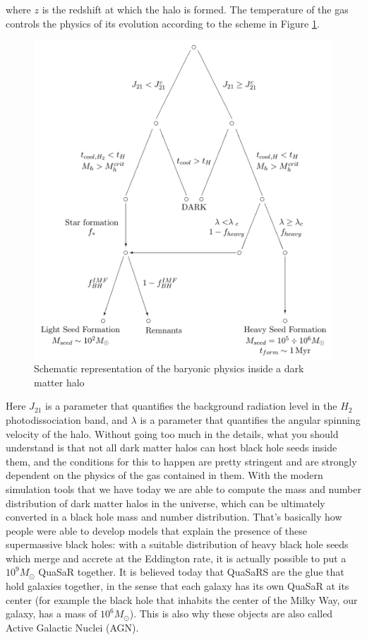where $z$ is the redshift at which the halo is formed. The temperature of the gas controls the physics of its evolution according to the scheme in Figure \ref{barscheme}. 
\begin{figure}
\begin{center}
\includegraphics[scale=0.5]{Draw/seeding_scheme.pdf}
\end{center}
\caption{Schematic representation of the baryonic physics inside a dark matter halo}
\label{barscheme}
\end{figure}
Here $J_{21}$ is a parameter that quantifies the background radiation level in the $H_2$ photodissociation band, and $\lambda$ is a parameter that quantifies the angular spinning velocity of the halo. Without going too much in the details, what you should understand is that not all dark matter halos can host black hole seeds inside them, and the conditions for this to happen are pretty stringent and are strongly dependent on the physics of the gas contained in them. With the modern simulation tools that we have today we are able to compute the mass and number distribution of dark matter halos in the universe, which can be ultimately converted in a black hole mass and number distribution. That's basically how people were able to develop models that explain the presence of these supermassive black holes: with a suitable distribution of heavy black hole seeds which merge and accrete at the Eddington rate, it is actually possible to put a $10^9 M_\odot$ QuaSaR together. It is believed today that QuaSaRS are the glue that hold galaxies together, in the sense that each galaxy has its own QuaSaR at its center (for example the black hole that inhabits the center of the Milky Way, our galaxy, has a mass of $10^6 M_\odot$). This is also why these objects are also called Active Galactic Nuclei (AGN).   

